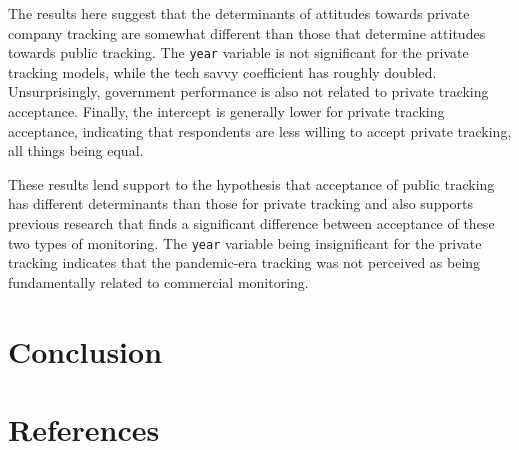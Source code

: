 \documentclass[
  letterpaper,
  DIV=11,
  numbers=noendperiod]{scrartcl}
\begin{document}
The results here suggest that the determinants of attitudes towards
private company tracking are somewhat different than those that
determine attitudes towards public tracking. The \texttt{year} variable
is not significant for the private tracking models, while the tech savvy
coefficient has roughly doubled. Unsurprisingly, government performance
is also not related to private tracking acceptance. Finally, the
intercept is generally lower for private tracking acceptance, indicating
that respondents are less willing to accept private tracking, all things
being equal.

These results lend support to the hypothesis that acceptance of public
tracking has different determinants than those for private tracking and
also supports previous research that finds a significant difference
between acceptance of these two types of monitoring. The \texttt{year}
variable being insignificant for the private tracking indicates that the
pandemic-era tracking was not perceived as being fundamentally related
to commercial monitoring.

\section{Conclusion}\label{sec-conclusion}

\newpage{}

\section{References}\label{references}
\end{document}
